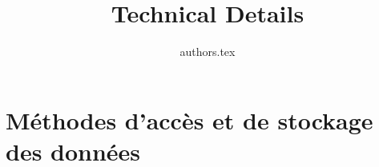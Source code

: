 \documentclass[12pt,onecolumn]{book}
\title{Technical Details}
\author{{authors.tex}}
\begin{document}
\maketitle

\tableofcontents


\chapter{Méthodes d'accès et de stockage des données}

\end{document}
